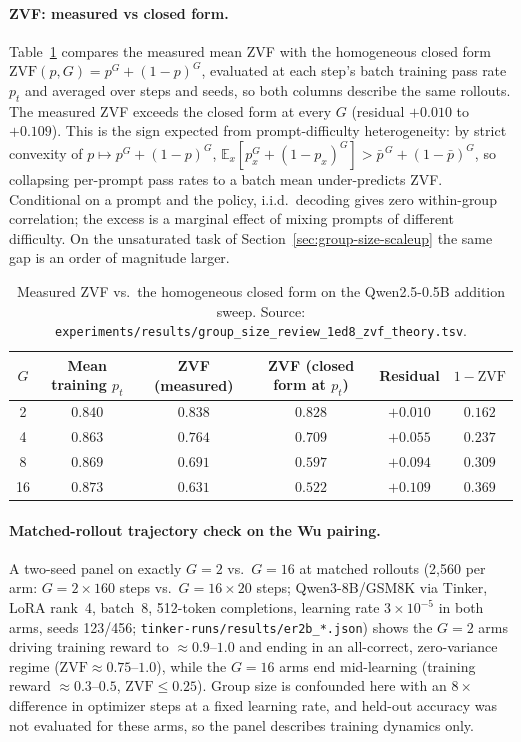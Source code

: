 \paragraph{ZVF: measured vs closed form.}
Table~\ref{tab:groupsize-zvf-theory} compares the measured mean ZVF with the
homogeneous closed form $\mathrm{ZVF}(p,G)=p^G+(1-p)^G$, evaluated at each step's
batch training pass rate $p_t$ and averaged over steps and seeds, so both columns
describe the same rollouts. The measured ZVF exceeds the closed form at every $G$
(residual $+0.010$ to $+0.109$). This is the sign expected from prompt-difficulty
heterogeneity: by strict convexity of $p\mapsto p^G+(1-p)^G$,
$\mathbb{E}_x[p_x^G+(1-p_x)^G] > \bar p^{\,G}+(1-\bar p)^G$, so collapsing per-prompt
pass rates to a batch mean under-predicts ZVF. Conditional on a prompt and the
policy, i.i.d.\ decoding gives zero within-group correlation; the excess is a
marginal effect of mixing prompts of different difficulty. On the unsaturated
task of Section~\ref{sec:group-size-scaleup} the same gap is an order of magnitude
larger.

\begin{table}[htbp]
\centering
\small
\begin{tabular}{cccccc}
\toprule
$G$ & Mean training $p_t$ & ZVF (measured) & ZVF (closed form at $p_t$) & Residual & $1-\mathrm{ZVF}$ \\
\midrule
2  & $0.840$ & $0.838$ & $0.828$ & $+0.010$ & $0.162$ \\
4  & $0.863$ & $0.764$ & $0.709$ & $+0.055$ & $0.237$ \\
8  & $0.869$ & $0.691$ & $0.597$ & $+0.094$ & $0.309$ \\
16 & $0.873$ & $0.631$ & $0.522$ & $+0.109$ & $0.369$ \\
\bottomrule
\end{tabular}
\caption{Measured ZVF vs.\ the homogeneous closed form on the Qwen2.5-0.5B
addition sweep. Source:
\texttt{experiments/results/group\_size\_review\_1ed8\_zvf\_theory.tsv}.}
\label{tab:groupsize-zvf-theory}
\end{table}

\paragraph{Matched-rollout trajectory check on the Wu pairing.}
A two-seed panel on exactly $G{=}2$ vs.\ $G{=}16$ at matched rollouts (2{,}560 per
arm: $G{=}2\times160$ steps vs.\ $G{=}16\times20$ steps; Qwen3-8B/GSM8K via Tinker,
LoRA rank~4, batch~8, 512-token completions, learning rate $3\times10^{-5}$ in both
arms, seeds 123/456; \texttt{tinker-runs/results/er2b\_*.json}) shows the $G{=}2$
arms driving training reward to $\approx0.9$--$1.0$ and ending in an all-correct,
zero-variance regime ($\mathrm{ZVF}\approx0.75$--$1.0$), while the $G{=}16$ arms end
mid-learning (training reward $\approx0.3$--$0.5$, $\mathrm{ZVF}\le0.25$). Group size
is confounded here with an $8\times$ difference in optimizer steps at a fixed
learning rate, and held-out accuracy was not evaluated for these arms, so the panel
describes training dynamics only.

